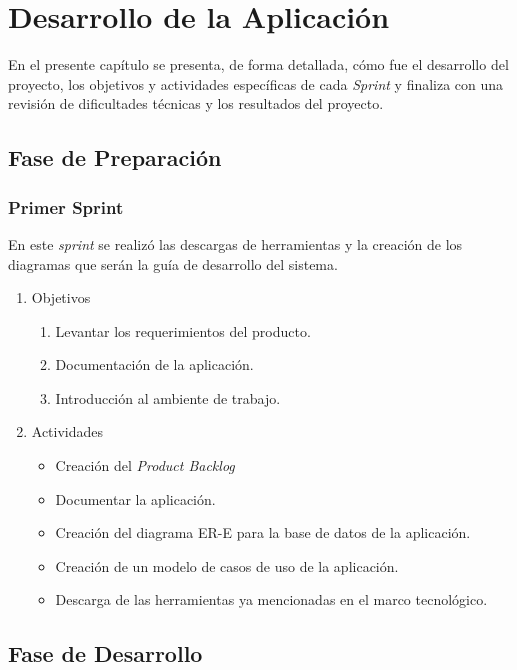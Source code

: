 \chapter{Desarrollo de la Aplicación}

En el presente capítulo se presenta, de forma detallada, cómo fue el desarrollo del proyecto, los objetivos y actividades específicas de cada \textit{Sprint} y finaliza con una revisión de dificultades técnicas y los resultados del proyecto.

\section{Fase de Preparación}
    \subsection{Primer Sprint}
    
    En este \textit{sprint} se realizó las descargas de herramientas y la creación de los diagramas que serán la guía de desarrollo del sistema.
    
    \begin{enumerate}
        \item Objetivos
        \begin{enumerate}
            \item Levantar los requerimientos del producto.
            \item Documentación de la aplicación.
            \item Introducción al ambiente de trabajo.
        \end{enumerate}
        \item Actividades
        \begin{itemize}
            \item Creación del \textit{Product Backlog}
            \item Documentar la aplicación.
            \item Creación del diagrama ER-E para la base de datos de la aplicación.
            \item Creación de un modelo de casos de uso de la aplicación.
            \item Descarga de las herramientas ya mencionadas en el marco tecnológico.
        \end{itemize}
    \end{enumerate}
        
\section{Fase de Desarrollo}
    
